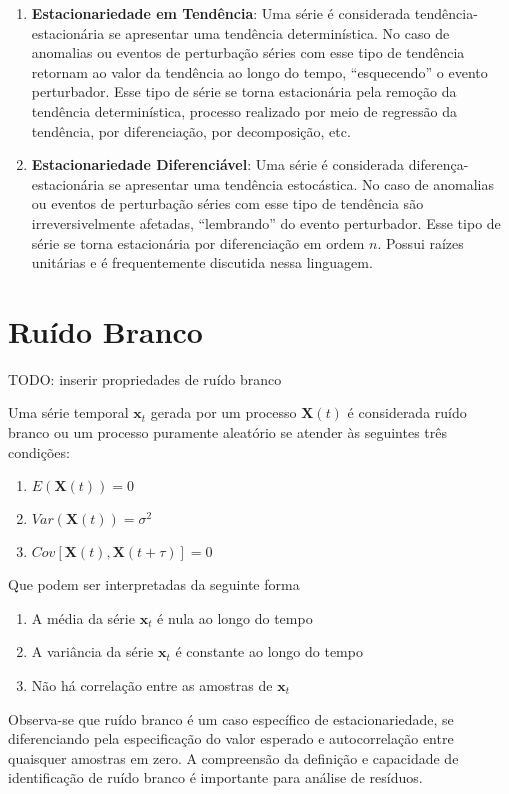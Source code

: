 \begin{enumerate}
    \item \textbf{Estacionariedade em Tendência}: Uma série é considerada
        tendência-estacionária se apresentar uma tendência determinística. No
        caso de anomalias ou eventos de perturbação séries com esse tipo de
        tendência retornam ao valor da tendência ao longo do tempo,
        ``esquecendo'' o evento perturbador. Esse tipo de série se torna
        estacionária pela remoção da tendência determinística, processo
        realizado por meio de regressão da tendência, por diferenciação, por
        decomposição, etc.
    \item \textbf{Estacionariedade Diferenciável}: Uma série é considerada
        diferença-estacionária se apresentar uma tendência estocástica. No
        caso de anomalias ou eventos de perturbação séries com esse tipo de
        tendência são irreversivelmente afetadas,
        ``lembrando'' do evento perturbador. Esse tipo de série se torna
        estacionária por diferenciação em ordem $n$. Possui raízes unitárias
        e é frequentemente discutida nessa linguagem.

\end{enumerate}

\section{Ruído Branco}\label{sec:white_noise}

TODO: inserir propriedades de ruído branco

Uma série temporal $\mathbf{x}_t$ gerada por um processo $\mathbf{X}(t)$ é
considerada ruído branco ou um processo puramente aleatório se atender às
seguintes três condições:

\begin{enumerate}
    \item $E(\mathbf{X}(t)) = 0$
    \item $Var(\mathbf{X}(t)) = \sigma^2$
    \item $Cov[\mathbf{X}(t), \mathbf{X}(t+\tau)] = 0$
\end{enumerate}\vspace{.5cm}

Que podem ser interpretadas da seguinte forma

\begin{enumerate}
    \item A média da série $\mathbf{x}_t$ é nula ao longo do tempo
    \item A variância da série $\mathbf{x}_t$ é constante ao longo do tempo
    \item Não há correlação entre as amostras de $\mathbf{x}_t$
\end{enumerate}\vspace{.5cm}

Observa-se que ruído branco é um caso específico de estacionariedade, se
diferenciando pela especificação do valor esperado e autocorrelação entre
quaisquer amostras em zero. A compreensão da definição e capacidade de
identificação de ruído branco é importante para análise de resíduos.
